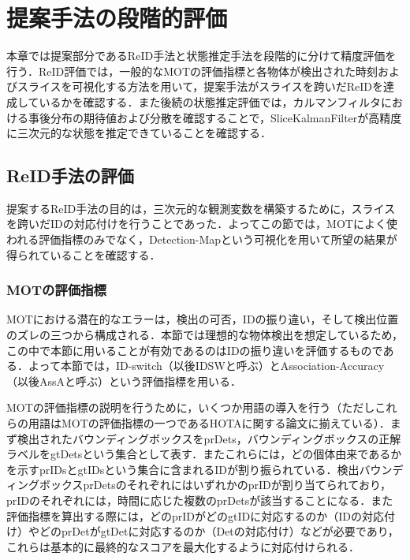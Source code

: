 \section{提案手法の段階的評価}
\label{sec:stage_evaluation}

本章では提案部分であるReID手法と状態推定手法を段階的に分けて精度評価を行う．ReID評価では，一般的なMOTの評価指標と各物体が検出された時刻およびスライスを可視化する方法を用いて，提案手法がスライスを跨いだReIDを達成しているかを確認する．また後続の状態推定評価では，カルマンフィルタにおける事後分布の期待値および分散を確認することで，SliceKalmanFilterが高精度に三次元的な状態を推定できていることを確認する．

    \subsection{ReID手法の評価}
    \label{subsec:reidentification_evaluation}

    提案するReID手法の目的は，三次元的な観測変数を構築するために，スライスを跨いだIDの対応付けを行うことであった．よってこの節では，MOTによく使われる評価指標のみでなく，Detection-Mapという可視化を用いて所望の結果が得られていることを確認する．

        \subsubsection{MOTの評価指標}

        MOTにおける潜在的なエラーは，検出の可否，IDの振り違い，そして検出位置のズレの三つから構成される．本節では理想的な物体検出を想定しているため，この中で本節に用いることが有効であるのはIDの振り違いを評価するものである．よって本節では，ID-switch（以後IDSWと呼ぶ）とAssociation-Accuracy（以後AssAと呼ぶ）という評価指標を用いる．

        MOTの評価指標の説明を行うために，いくつか用語の導入を行う（ただしこれらの用語はMOTの評価指標の一つであるHOTAに関する論文\cite{luiten2021hota}に揃えている）．まず検出されたバウンディングボックスをprDets，バウンディングボックスの正解ラベルをgtDetsという集合として表す．またこれらには，どの個体由来であるかを示すprIDsとgtIDsという集合に含まれるIDが割り振られている．検出バウンディングボックスprDetsのそれぞれにはいずれかのprIDが割り当てられており，prIDのそれぞれには，時間に応じた複数のprDetsが該当することになる．また評価指標を算出する際には，どのprIDがどのgtIDに対応するのか（IDの対応付け）やどのprDetがgtDetに対応するのか（Detの対応付け）などが必要であり，これらは基本的に最終的なスコアを最大化するように対応付けられる．
    
